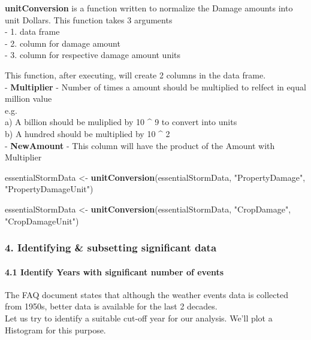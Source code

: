 \documentclass[]{article}
\newenvironment{Shaded}{\begin{snugshade}}{\end{snugshade}}
\newcommand{\KeywordTok}[1]{\textcolor[rgb]{0.13,0.29,0.53}{\textbf{{#1}}}}
\newcommand{\StringTok}[1]{\textcolor[rgb]{0.31,0.60,0.02}{{#1}}}
\newcommand{\NormalTok}[1]{{#1}}
\let\oldparagraph\paragraph
\renewcommand{\paragraph}[1]{\oldparagraph{#1}\mbox{}}
\begin{document}
\textbf{unitConversion} is a function written to normalize the Damage
amounts into unit Dollars. This function takes 3 arguments\\
- 1. data frame\\
- 2. column for damage amount\\
- 3. column for respective damage amount units

This function, after executing, will create 2 columns in the data
frame.\\
- \textbf{Multiplier} - Number of times a amount should be multiplied to
relfect in equal million value\\
e.g.\\
a) A billion should be muliplied by 10 \^{} 9 to convert into units\\
b) A hundred should be multiplied by 10 \^{} 2\\
- \textbf{NewAmount} - This column will have the product of the Amount
with Multiplier

\begin{Shaded}
\begin{Highlighting}[]
\NormalTok{essentialStormData <-}\StringTok{ }\KeywordTok{unitConversion}\NormalTok{(essentialStormData,}
                                     \StringTok{"PropertyDamage"}\NormalTok{, }
                                     \StringTok{"PropertyDamageUnit"}\NormalTok{)}

\NormalTok{essentialStormData <-}\StringTok{ }\KeywordTok{unitConversion}\NormalTok{(essentialStormData,}
                                     \StringTok{"CropDamage"}\NormalTok{, }
                                     \StringTok{"CropDamageUnit"}\NormalTok{)}
\end{Highlighting}
\end{Shaded}

\subsubsection{4. Identifying \& subsetting significant
data}\label{identifying-subsetting-significant-data}

\paragraph{4.1 Identify Years with significant number of
events}\label{identify-years-with-significant-number-of-events}

The FAQ document states that although the weather events data is
collected from 1950s, better data is available for the last 2 decades.\\
Let us try to identify a suitable cut-off year for our analysis. We'll
plot a Histogram for this purpose.
\end{document}
